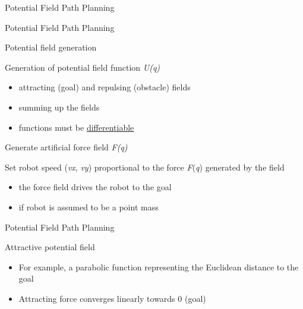 \documentclass[compress]{beamer}
\begin{document}
\begin{frame}{Potential Field Path Planning}

\end{frame}

\begin{frame}{Potential Field Path Planning}

Potential field generation

Generation of potential field function \emph{U(q)}

\begin{itemize}
\item attracting (goal) and repulsing (obstacle) fields
\item summing up the fields
\item functions must be
  \href{http://en.wikipedia.org/wiki/Differentiable_function}{differentiable}
\end{itemize}

Generate artificial force field \emph{F(q)}

\begin{block}{\emph{}}

\end{block}

\begin{block}{\emph{}}

\end{block}

\begin{block}{\emph{}}

Set robot speed (\emph{vx}, \emph{vy}) proportional to the force
\emph{F}(\emph{q}) generated by the field

\begin{itemize}
\item the force field drives the robot to the goal
\item if robot is assumed to be a point mass
\end{itemize}

\end{block}

\end{frame}

\begin{frame}{Potential Field Path Planning}

Attractive potential field

\begin{itemize}
\item For example, a parabolic function representing the Euclidean distance
  to the goal
\item Attracting force converges linearly towards 0 (goal)
\end{itemize}

\end{frame}
\end{document}
